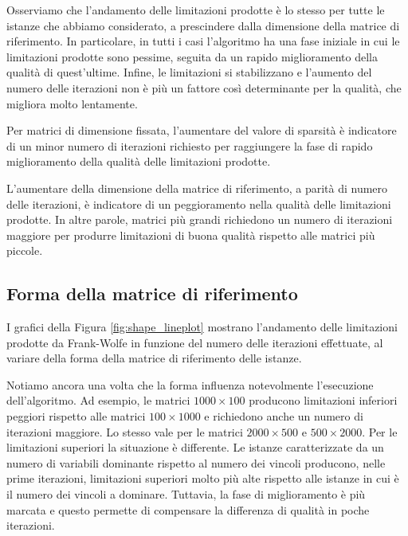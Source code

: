 Osserviamo che l'andamento delle limitazioni prodotte è lo stesso per tutte le istanze che abbiamo considerato, a
prescindere dalla dimensione della matrice di riferimento. In particolare, in tutti i casi l'algoritmo ha una fase
iniziale in cui le limitazioni prodotte sono pessime, seguita da un rapido miglioramento della qualità di quest'ultime.
Infine, le limitazioni si stabilizzano e l'aumento del numero delle iterazioni non è più un fattore così determinante
per la qualità, che migliora molto lentamente.

Per matrici di dimensione fissata, l'aumentare del valore di sparsità è indicatore di un minor numero di iterazioni richiesto
per raggiungere la fase di rapido miglioramento della qualità delle limitazioni prodotte.

L'aumentare della dimensione della matrice di riferimento, a parità di numero delle iterazioni, è indicatore di un
peggioramento nella qualità delle limitazioni prodotte. In altre parole, matrici più grandi richiedono un numero di
iterazioni maggiore per produrre limitazioni di buona qualità rispetto alle matrici più piccole.

\subsection{Forma della matrice di riferimento}
I grafici della Figura \ref{fig:shape_lineplot} mostrano l'andamento delle limitazioni prodotte da Frank-Wolfe in
funzione del numero delle iterazioni effettuate, al variare della forma della matrice di riferimento delle istanze.

Notiamo ancora una volta che la forma influenza notevolmente l'esecuzione dell'algoritmo. Ad esempio, le matrici \(
1000\times 100 \) producono limitazioni inferiori peggiori rispetto alle matrici \( 100\times 1000 \) e richiedono anche
un numero di iterazioni maggiore. Lo stesso vale per le matrici \( 2000\times 500 \) e \( 500\times 2000 \). Per le
limitazioni superiori la situazione è differente. Le istanze caratterizzate da un numero di variabili dominante rispetto
al numero dei vincoli producono, nelle prime iterazioni, limitazioni superiori molto più alte rispetto alle istanze in
cui è il numero dei vincoli a dominare. Tuttavia, la fase di miglioramento è più marcata e questo permette di
compensare la differenza di qualità in poche iterazioni.

